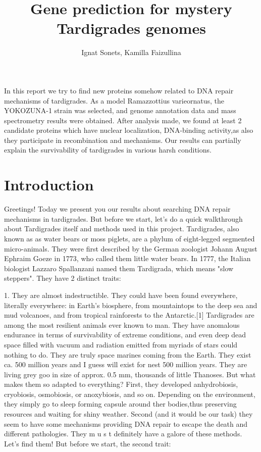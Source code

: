 \documentclass{article}
\title{ Gene prediction for mystery Tardigrades genomes }
\author{ Ignat Sonets, Kamilla Faizullina}
\date{\empty}
\begin{document}
\maketitle
 
 
 In this report we try to find new proteins somehow related to DNA repair mechanisms of tardigrades. As a model Ramazzottius varieornatus, the YOKOZUNA-1 strain was selected, and genome annotation data and mass spectrometry results were obtained. After analysis made, we found at least 2 candidate proteins which have  nuclear localization, DNA-binding activity,as also they participate in recombination and mechanisms. Our results can partially explain the survivability of tardigrades in various harsh conditions.
 
 
\section{Introduction}
 
 Greetings! Today we present you our results about searching DNA repair mechanisms in tardigrades. But before we start, let's do a quick walkthrough about Tardigrades itself and methods used in this project.
 Tardigrades, also known as as water bears or moss piglets, are a phylum of eight-legged segmented micro-animals. They were first described by the German zoologist Johann August Ephraim Goeze in 1773, who called them little water bears. In 1777, the Italian biologist Lazzaro Spallanzani named them Tardigrada, which means "slow steppers"\cite{1}. 
 They have 2 distinct traits:
 
 1. They are almost indestructible. They could have been found everywhere, literally everywhere: in Earth's biosphere, from mountaintops to the deep sea and mud volcanoes, and from tropical rainforests to the Antarctic.[1] Tardigrades are among the most resilient animals ever known to man. They have anomalous endurance in terms of survivability of extreme conditions, and even deep dead space filled with vacuum and radiation emitted from myriads of stars could nothing to do. They are truly space marines coming from the Earth. They exist ca. 500 million years and I guess will exist for nest 500 million years. They are living grey goo in size of approx. 0.5 mm, thousands of little Thanoses. But what makes them so adapted to everything? First, they developed  anhydrobiosis, cryobiosis, osmobiosis, or anoxybiosis, and so on. Depending on the environment, they simply go to sleep forming capsule around ther bodies,thus preserving resources and waiting for shiny weather. Second (and it would be our task) they seem to have some mechanisms providing DNA repair to escape the death and different pathologies. They m u s t definitely have a galore of these methods. Let's find them! But before we start, the second trait:
 
\end{document}
